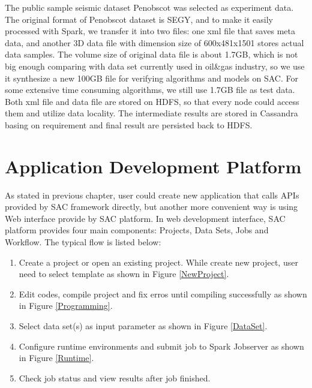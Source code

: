 The public sample seismic dataset Penobscot \cite{PenobscotData} was selected as experiment data. The original format of Penobscot dataset is SEGY, and to make it easily processed with Spark, we transfer it into two files: one xml file that saves meta data, and another 3D data file with dimension size of 600x481x1501 stores actual data samples. The volume size of original data file is about 1.7GB, which is not big enough comparing with data set currently used in oil\&gas industry, so we use it synthesize a new 100GB file for verifying algorithms and models on SAC. For some extensive time consuming algorithms, we still use 1.7GB file as test data. Both xml file and data file are stored on HDFS, so that every node could access them and utilize data locality. The intermediate results are stored in Cassandra basing on requirement and final result are persisted back to HDFS. 

\section{Application Development Platform}

As stated in previous chapter, user could create new application that calls APIs provided by SAC framework directly, but another more convenient way is using Web interface provide by SAC platform. In web development interface, SAC platform provides four main components: Projects, Data Sets, Jobs and Workflow. The typical flow is listed below:

\begin{enumerate}
  \item Create a project or open an existing project. While create new project, user need to select template as shown in Figure \ref{NewProject}.
  \item Edit codes, compile project and fix erros until compiling successfully as shown in Figure \ref{Programming}.
  \item Select data set(s) as input parameter as shown in Figure \ref{DataSet}.
  \item Configure runtime environments and submit job to Spark Jobserver as shown in Figure \ref{Runtime}.
  \item Check job status and view results after job finished.
\end{enumerate}

